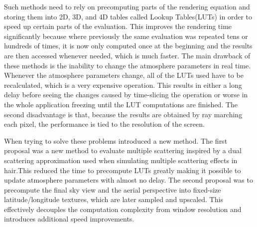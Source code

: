 \documentclass{ctuthesis}
\begin{document}
Such methods need to rely on precomputing parts of the rendering equation and storing them into 2D,
3D, and 4D tables called Lookup Tables(LUTs) in order to speed up certain parts of the evaluation.
This improves the rendering time significantly because where previously the same evaluation was
repeated tens or hundreds of times, it is now only computed once at the beginning and the results
are then accessed whenever needed, which is much faster. The main drawback of these methods is the
inability to change the atmosphere parameters in real time. Whenever the atmosphere parameters change, all 
of the LUTs used have to be recalculated, which is a very expensive operation. This results in either a long delay 
before seeing the changes caused by time-slicing the operation or worse in the whole application 
freezing until the LUT computations are finished. The second disadvantage is that, because the results
are obtained by ray marching each pixel, the performance is tied to the resolution of the screen.

When trying to solve these problems \cite{hillaire_2020} introduced a new method. The first proposal was a
new method to evaluate multiple scattering inspired by a dual scattering approximation used 
when simulating multiple scattering effects in hair.This reduced the time to precompute LUTs
greatly making it possible to update atmosphere parameters with almost no delay.
The second proposal was to precompute the final sky view and the aerial perspective into fixed-size
latitude/longitude textures, which are later sampled and upscaled. This effectively decouples the
computation complexity from window resolution and introduces additional speed improvements. 

\end{document}
